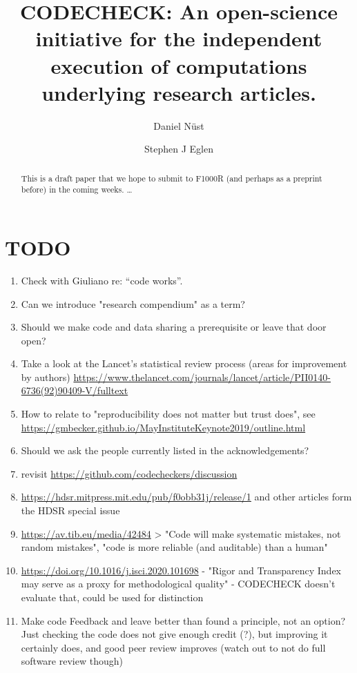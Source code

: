 \documentclass[12pt]{article}
\begin{document}
\title{CODECHECK: An open-science initiative for the independent execution of computations underlying research articles.}
\author[1,$\ast$]{Daniel N\"{u}st}
\author[2,$\ast$]{Stephen J Eglen}
\maketitle
\begin{abstract}
  This is a draft paper that we hope to submit to F1000R (and perhaps
  as a preprint before) in the coming weeks.
  \ldots{}
\end{abstract}

\section*{TODO}\label{todo}

\begin{enumerate}
\item Check with Giuliano re: ``code works''.
\item Can we introduce "research compendium" as a term?
\item Should we make code and data sharing a prerequisite or leave that door open?
\item Take a look at the Lancet's statistical review process (areas for improvement by authors) \url{https://www.thelancet.com/journals/lancet/article/PII0140-6736(92)90409-V/fulltext}
\item How to relate to "reproducibility does not matter but trust does", see \url{https://gmbecker.github.io/MayInstituteKeynote2019/outline.html}
\item Should we ask the people currently listed in the acknowledgements?
\item revisit \url{https://github.com/codecheckers/discussion}
\item \url{https://hdsr.mitpress.mit.edu/pub/f0obb31j/release/1} and other articles form the HDSR special issue
\item \url{https://av.tib.eu/media/42484} > "Code will make systematic mistakes, not random mistakes", "code is more reliable (and auditable) than a human"
\item \url{https://doi.org/10.1016/j.isci.2020.101698} - "Rigor and Transparency Index may serve as a proxy for methodological quality" - CODECHECK doesn't evaluate that, could be used for distinction
\item Make code Feedback and leave better than found a principle, not an option? Just checking the code does not give enough credit (?), but improving it certainly does, and good peer review improves (watch out to not do full software review though)
\end{enumerate}
\end{document}
